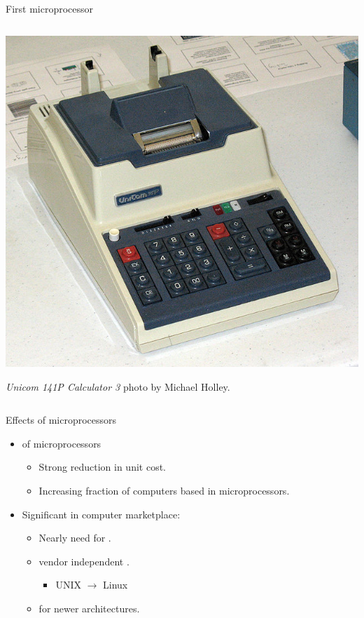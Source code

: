 \begin{frame}[t]{First microprocessor}
\begin{columns}[T]
\begin{column}{.3\textwidth}
\begin{tiny}
    \end{tiny}
    \vspace{1em}
    \includegraphics[width=.5\textwidth]{images/i4004-calculator.jpg}\\
    \begin{tiny}
      \emph{Unicom 141P Calculator 3} photo by Michael Holley.\\ 
    \end{tiny}
  \end{column}
\end{columns}
\end{frame}

\begin{frame}[t]{Effects of microprocessors}
\begin{itemize}
  \item {} of microprocessors
    \begin{itemize}
      \item Strong reduction in unit cost.
      \item Increasing fraction of computers based in microprocessors.
    \end{itemize}

  \item Significant  in computer marketplace:
    \begin{itemize}
	\item Nearly  need for .
      \item {} vendor independent .
        \begin{itemize}
          \item UNIX $\rightarrow$ Linux
        \end{itemize}
      \item {} for newer architectures.
    \end{itemize}
\end{itemize}
\end{frame}

